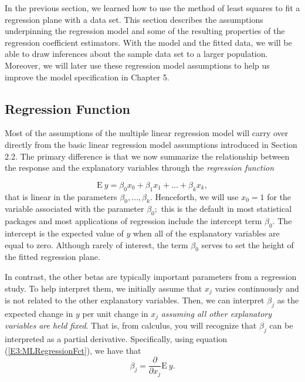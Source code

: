 In the previous section, we learned how to use the method of least
squares to fit a regression plane with a data set. This section
describes the assumptions underpinning the regression model and some
of the resulting properties of the regression coefficient
estimators. With the model and the fitted data, we will be able to
draw inferences about the sample data set to a larger population.
Moreover, we will later use these regression model assumptions to
help us improve the model specification in Chapter 5.

\subsection{Regression Function}

Most of the assumptions of the multiple linear regression model will
carry over directly from the basic linear regression model
assumptions introduced in Section 2.2. The primary difference is
that we now summarize the relationship between the response and the
explanatory variables through the \emph{regression
function}

\begin{equation}\label{E3:MLRegressionFct}
\mathrm{E~}y=\beta_0 x_0+\beta_1 x_1+\ldots+\beta_k x_k,
\end{equation}%
that is linear in the parameters $\beta_0,\ldots ,\beta_k$.
Henceforth, we will use $x_0=1$ for the variable associated with the
parameter $\beta_0;$ this is the default in most statistical
packages and most applications of regression include the intercept
term $\beta_0$. The intercept is the expected value of $y$ when all
of the explanatory variables are equal to zero. Although rarely of
interest, the term $\beta_0$ serves to set the height of the fitted
regression plane.


In contrast, the other betas are typically important parameters from
a regression study. To help interpret them, we initially assume that
$x_j$ varies continuously and is not related to the other
explanatory variables. Then, we can interpret $\beta_j$ as the
expected change in $y$ per unit change in $x_j$ \emph{assuming all
other explanatory variables are held fixed}. That is, from calculus,
you will recognize that $\beta_j$ can be interpreted as a partial
derivative. Specifically, using equation (\ref{E3:MLRegressionFct}),
we have that
\begin{equation*}
\beta_j=\frac{\partial }{\partial x_j}\mathrm{E}~y.
\end{equation*}


